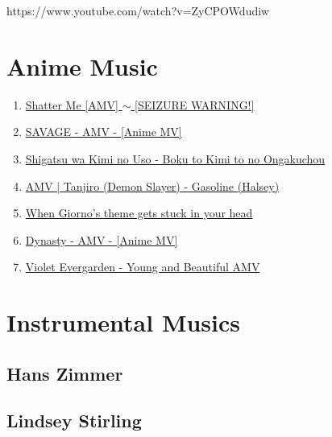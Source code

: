 \documentclass{book}
\numberwithin{equation}{section}
\begin{document}
https://www.youtube.com/watch?v=ZyCPOWdudiw


\part{Anime Music}

\begin{enumerate}
    \item \href{https://www.youtube.com/watch?v=21nlozmIbP0}{Shatter Me [AMV] $\sim$ [SEIZURE WARNING!]}
    \item \href{https://www.youtube.com/watch?v=80fcg329zBY}{SAVAGE - AMV - [Anime MV]}
    \item \href{https://www.youtube.com/watch?v=i0Q7T_9vNNE}{Shigatsu wa Kimi no Uso - Boku to Kimi to no Ongakuchou}
    \item \href{https://www.youtube.com/watch?v=Gm-ywPzO0NA}{AMV | Tanjiro (Demon Slayer) - Gasoline (Halsey)}
    \item \href{https://www.youtube.com/watch?v=ZyCPOWdudiw}{When Giorno's theme gets stuck in your head}
    \item \href{https://www.youtube.com/watch?v=oxkgOEiE_HY}{Dynasty - AMV - [Anime MV]}
    \item \href{https://www.youtube.com/watch?v=TWEFFbh7rn0}{Violet Evergarden - Young and Beautiful AMV}
\end{enumerate}


\part{Instrumental Musics}

\chapter{Hans Zimmer}




\chapter{Lindsey Stirling}
\end{document}
